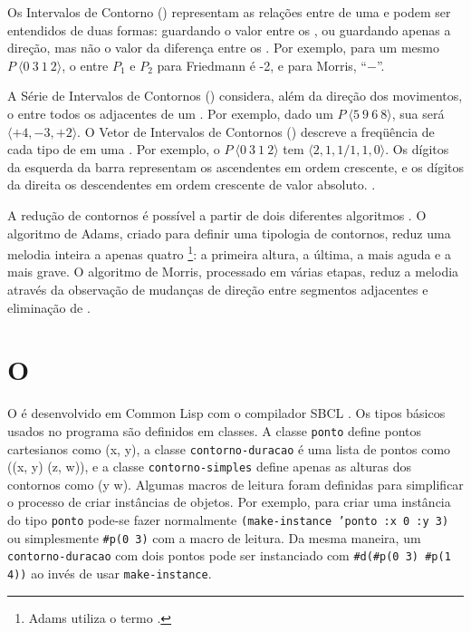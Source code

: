 Os Intervalos de Contorno () representam as relações entre
 de uma  e podem ser entendidos de duas
formas: guardando o valor entre os 
\cite{friedmann85:methodology}, ou guardando apenas a direção, mas não
o valor da diferença entre os 
\cite{morris93:directions}. Por exemplo, para um mesmo 
$P\:\langle0\:3\:1\:2\rangle$, o  entre $P_1$ e $P_2$ para
Friedmann é -2, e para Morris, ``$-$''.

A Série de Intervalos de Contornos () considera, além da
direção dos movimentos, o  entre todos os 
adjacentes de um . Por exemplo, dado um 
$P\:\langle5\:9\:6\:8\rangle$, sua  será
$\langle+4,-3,+2\rangle$. O Vetor de Intervalos de Contornos
() descreve a freqüência de cada tipo de  em uma
. Por exemplo, o  $P\:\langle0\:3\:1\:2\rangle$
tem  $\langle2,1,1/1,1,0\rangle$. Os dígitos da esquerda da
barra representam os  ascendentes em ordem crescente, e os
dígitos da direita os  descendentes em ordem crescente de
valor absoluto. \cite{friedmann85:methodology}.


A redução de contornos é possível a partir de dois diferentes
algoritmos \cite{adams76:melodic,morris93:directions}. O algoritmo de
Adams, criado para definir uma tipologia de contornos, reduz uma
melodia inteira a apenas quatro \footnote{Adams utiliza
  o termo .}: a primeira altura, a última, a
mais aguda e a mais grave. O algoritmo de Morris, processado em várias
etapas, reduz a melodia através da observação de mudanças de direção
entre segmentos adjacentes e eliminação de .

\section{O \goiaba{}}
\label{sec:o-software}

O \goiaba{} é desenvolvido em Common Lisp com o compilador SBCL
\cite{team07:sbcl}. Os tipos básicos usados no programa são definidos
em classes. A classe \texttt{ponto} define pontos cartesianos como (x,
y), a classe \texttt{contorno-duracao} é uma lista de pontos como ((x,
y) (z, w)), e a classe \texttt{contorno-simples} define apenas as
alturas dos contornos como (y w). Algumas macros de leitura foram
definidas para simplificar o processo de criar instâncias de objetos.
Por exemplo, para criar uma instância do tipo \texttt{ponto} pode-se
fazer normalmente \texttt{(make-instance 'ponto :x 0 :y 3)} ou
simplesmente \verb!#p(0 3)! com a macro de leitura. Da mesma maneira,
um \texttt{contorno-duracao} com dois pontos pode ser instanciado com
\verb!#d(#p(0 3) #p(1 4))! ao invés de usar \texttt{make-instance}.

